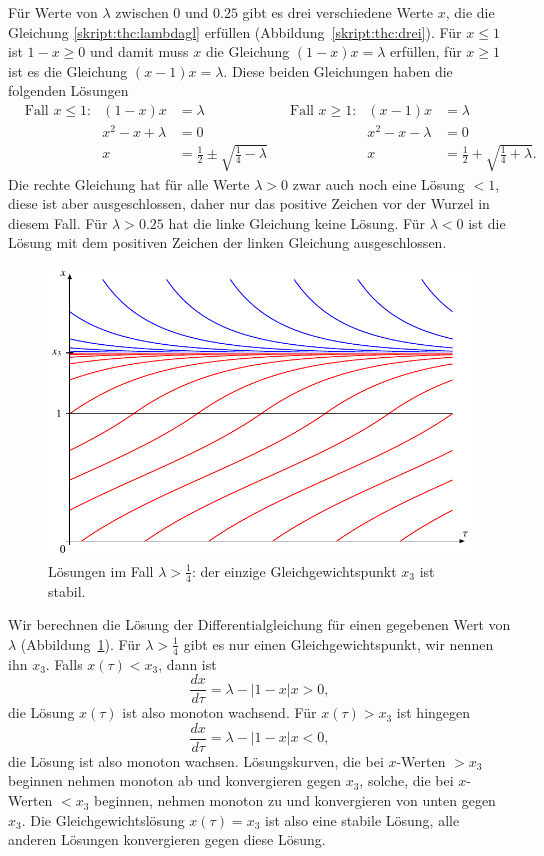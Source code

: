 Für Werte von $\lambda$ zwischen $0$ und $0.25$ gibt es drei verschiedene
Werte $x$, die die Gleichung \eqref{skript:thc:lambdagl} erfüllen
(Abbildung~\ref{skript:thc:drei}).
Für $x\le 1$  ist $1-x\ge 0$ und damit muss $x$ die 
Gleichung $(1-x)x=\lambda$ erfüllen, für $x\ge 1$ ist es die Gleichung
$(x-1)x=\lambda$.
Diese beiden Gleichungen haben die folgenden Lösungen
\begin{align*}
&\text{Fall $x \le 1$:}
&
(1-x)x&=\lambda
&
&\text{Fall $x\ge 1$:}
&
(x-1)x&=\lambda
\\
&&
x^2-x+\lambda&=0
&&&
x^2-x-\lambda&=0
\\
&&
x&=\frac12\pm\sqrt{\frac14-\lambda}
&&&
x&=\frac12+\sqrt{\frac14+\lambda}.
\end{align*}
Die rechte Gleichung hat für alle Werte $\lambda > 0$ zwar auch noch
eine Lösung $<1$, diese ist aber ausgeschlossen, daher nur das
positive Zeichen vor der Wurzel in diesem Fall.
Für $\lambda > 0.25$ hat die linke Gleichung keine Lösung.
Für $\lambda < 0$ ist die Lösung mit dem positiven Zeichen der linken
Gleichung ausgeschlossen.

\begin{figure}
\centering
\includegraphics{chapters/4/ein.pdf}
\caption{Lösungen im Fall $\lambda > \frac14$: der einzige
Gleichgewichtspunkt $x_3$ ist stabil.
\label{skript:thc:ein}}
\end{figure}%
Wir berechnen die Lösung der Differentialgleichung für einen gegebenen
Wert von $\lambda$ (Abbildung~\ref{skript:thc:ein}).
Für $\lambda >\frac14$ gibt es nur einen Gleichgewichtspunkt, wir 
nennen ihn $x_3$.
Falls $x(\tau)<x_3$, dann ist
\[
\frac{dx}{d\tau}
=
\lambda - |1-x|x > 0,
\]
die Lösung $x(\tau)$ ist also monoton wachsend.
Für $x(\tau) > x_3$ ist hingegen
\[
\frac{dx}{d\tau}
=
\lambda - |1-x|x < 0,
\]
die Lösung ist also monoton wachsen.
Lösungskurven, die bei $x$-Werten $>x_3$ beginnen nehmen monoton ab
und konvergieren gegen $x_3$, solche, die bei $x$-Werten $<x_3$ beginnen,
nehmen monoton zu und konvergieren von unten gegen $x_3$.
Die Gleichgewichtslösung $x(\tau)=x_3$ ist also eine stabile Lösung,
alle anderen Lösungen konvergieren gegen diese Lösung.

